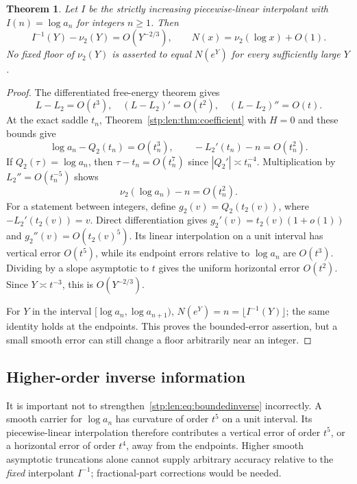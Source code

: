\documentclass[11pt]{article}
\newtheorem{theorem}{Theorem}[section]
\theoremstyle{remark}\newtheorem{remark}[theorem]{Remark}
\begin{document}
\begin{theorem}\label{stp:len:thm:boundedinverse}
Let $I$ be the strictly increasing piecewise-linear interpolant with $I(n)=\log a_n$ for integers $n\ge1$. Then
\begin{equation}\label{stp:len:eq:boundedinverse}
 I^{-1}(Y)-\nu_2(Y)=O(Y^{-2/3}),\qquad
 N(x)=\nu_2(\log x)+O(1).
\end{equation}
No fixed floor of $\nu_2(Y)$ is asserted to equal $N(e^Y)$ for every sufficiently large $Y$.
\end{theorem}
\begin{proof}
The differentiated free-energy theorem gives
\[
 L-L_2=O(t^3),\quad (L-L_2)'=O(t^2),\quad (L-L_2)''=O(t).
\]
At the exact saddle $t_n$, Theorem~\ref{stp:len:thm:coefficient} with $H=0$ and these bounds give
\[
 \log a_n-Q_2(t_n)=O(t_n^3),\qquad -L_2'(t_n)-n=O(t_n^2).
\]
If $Q_2(\tau)=\log a_n$, then $\tau-t_n=O(t_n^7)$ since $|Q_2'|\asymp t_n^{-4}$. Multiplication by $L_2''=O(t_n^{-5})$ shows
\[
 \nu_2(\log a_n)-n=O(t_n^2).
\]
For a statement between integers, define $g_2(v)=Q_2(t_2(v))$, where $-L_2'(t_2(v))=v$. Direct differentiation gives $g_2'(v)=t_2(v)(1+o(1))$ and $g_2''(v)=O(t_2(v)^5)$. Its linear interpolation on a unit interval has vertical error $O(t^5)$, while its endpoint errors relative to $\log a_n$ are $O(t^3)$. Dividing by a slope asymptotic to $t$ gives the uniform horizontal error $O(t^2)$. Since $Y\asymp t^{-3}$, this is $O(Y^{-2/3})$.

For $Y$ in the interval $[\log a_n,\log a_{n+1})$, $N(e^Y)=n=\lfloor I^{-1}(Y)\rfloor$; the same identity holds at the endpoints. This proves the bounded-error assertion, but a small smooth error can still change a floor arbitrarily near an integer.
\end{proof}

\subsection{Higher-order inverse information}
It is important not to strengthen~\eqref{stp:len:eq:boundedinverse} incorrectly. A smooth carrier for $\log a_n$ has curvature of order $t^5$ on a unit interval. Its piecewise-linear interpolation therefore contributes a vertical error of order $t^5$, or a horizontal error of order $t^4$, away from the endpoints. Higher smooth asymptotic truncations alone cannot supply arbitrary accuracy relative to the \emph{fixed} interpolant $I^{-1}$; fractional-part corrections would be needed.
\end{document}
